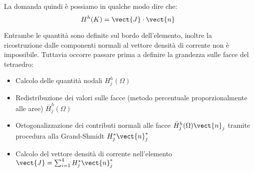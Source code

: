 La domanda quindi \`e possiamo in qualche modo dire che:
\begin{equation}
H^h(K) = \vect{J}\cdot \vect{n} 
\end{equation}

Entrambe le quantit\`a sono definite sul bordo dell'elemento, inoltre la ricostruzione dalle componenti normali al vettore densit\`a di corrente non \`e impossibile.
Tuttavia occorre passare prima a definire la grandezza sulle facce del tetraedro:
\begin{itemize}
\item Calcolo delle quantit\`a nodali $H^h_j(\Omega)$
\item Redistribuzione dei valori sulle facce (metodo percentuale proporzionalmente alle aree) $\bar{H}^h_j(\Omega)$
\item Ortogonalizzazione dei contributi normali alle facce $\bar{H}^h_j(\Omega) \vect{n}_j$ tramite procedura alla Grand-Shmidt $H^*_j \vect{n}_j^*$
\item Calcolo del vettore densit\`a di corrente nell'elemento $\vect{J}=\sum_{i=1}^4 H^*_j\vect{n}_j^*$
\end{itemize}







